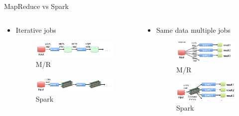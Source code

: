\documentclass[presentation, aspectratio=169]{beamer}
\begin{document}
\begin{frame}[label={sec:org17743a0}]{MapReduce vs Spark}
\begin{columns}
\begin{column}{0.5\columnwidth}
\begin{itemize}
\item Iterative jobs
\begin{figure}[htbp]
\centering
\includegraphics[width=.9\linewidth]{./img/mr-iterative.png}
\caption{\label{fig:org649b7da}M/R}
\end{figure}
\begin{figure}[htbp]
\centering
\includegraphics[width=.9\linewidth]{./img/spark-iterative.png}
\caption{\label{fig:org7f6cbf1}Spark}
\end{figure}
\end{itemize}
\end{column}

\begin{column}{0.5\columnwidth}
\begin{itemize}
\item Same data multiple jobs
\begin{figure}[htbp]
\centering
\includegraphics[width=.9\linewidth]{./img/map-multiple.png}
\caption{\label{fig:org6e8a537}M/R}
\end{figure}
\begin{figure}[htbp]
\centering
\includegraphics[width=.9\linewidth]{./img/spark-multiple.png}
\caption{\label{fig:org79795c1}Spark}
\end{figure}
\end{itemize}
\end{column}
\end{columns}
\end{frame}
\end{document}
